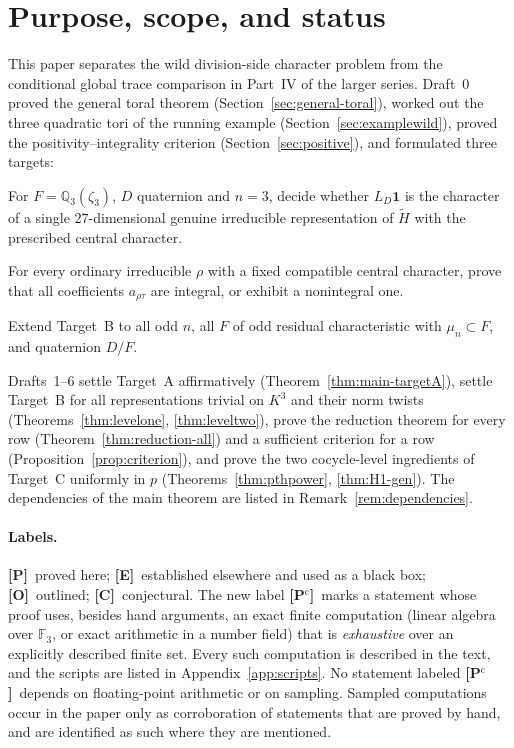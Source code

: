 \documentclass[11pt]{article}
\newcommand{\Q}{\mathbb Q}
\newcommand{\Fq}{\mathbb F}
\newcommand{\tH}{\widetilde H}
\newcommand{\Ptag}{\textnormal{\textbf{[P]}}}
\newcommand{\Pctag}{\textnormal{\textbf{[P$^{\mathrm c}$]}}}
\newcommand{\Etag}{\textnormal{\textbf{[E]}}}
\newcommand{\Otag}{\textnormal{\textbf{[O]}}}
\newcommand{\Ctag}{\textnormal{\textbf{[C]}}}
\theoremstyle{plain}
\theoremstyle{definition}
\begin{document}
\section{Purpose, scope, and status}\label{sec:intro}
This paper separates the wild division-side character problem from the
conditional global trace comparison in Part~IV of the larger series.
Draft~0 proved the general toral theorem (Section~\ref{sec:general-toral}),
worked out the three quadratic tori of the running example
(Section~\ref{sec:examplewild}), proved the positivity--integrality
criterion (Section~\ref{sec:positive}), and formulated three targets:
\begin{description}[style=nextline]
\item[Target A] For $F=\Q_3(\zeta_3)$, $D$ quaternion and $n=3$, decide
whether $L_D\mathbf1$ is the character of a single $27$-dimensional
genuine irreducible representation of $\tH$ with the prescribed central
character.
\item[Target B] For every ordinary irreducible $\rho$ with a fixed
compatible central character, prove that all coefficients $a_{\rho\tau}$
are integral, or exhibit a nonintegral one.
\item[Target C] Extend Target~B to all odd $n$, all $F$ of odd residual
characteristic with $\mu_n\subset F$, and quaternion $D/F$.
\end{description}
Drafts~1--6 settle Target~A affirmatively (Theorem~\ref{thm:main-targetA}),
settle Target~B for all representations trivial on $K^3$ and their norm
twists (Theorems~\ref{thm:levelone}, \ref{thm:leveltwo}), prove the reduction theorem for
every row (Theorem~\ref{thm:reduction-all}) and a sufficient criterion
for a row (Proposition~\ref{prop:criterion}), and prove the two
cocycle-level ingredients of Target~C uniformly in $p$
(Theorems~\ref{thm:pthpower}, \ref{thm:H1-gen}).  The dependencies of
the main theorem are listed in Remark~\ref{rem:dependencies}.

\paragraph{Labels.}
\Ptag\ proved here; \Etag\ established elsewhere and used as a black
box; \Otag\ outlined; \Ctag\ conjectural.  The new label \Pctag\ marks
a statement whose proof uses, besides hand arguments, an exact finite
computation (linear algebra over $\Fq_3$, or exact arithmetic in a
number field) that is \emph{exhaustive} over an explicitly described
finite set.  Every such computation is described in the text, and the
scripts are listed in Appendix~\ref{app:scripts}.  No statement
labeled \Pctag\ depends on floating-point arithmetic or on sampling.
Sampled computations occur in the paper only as corroboration of
statements that are proved by hand, and are identified as such where
they are mentioned.
\end{document}
